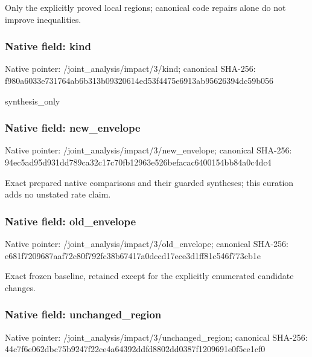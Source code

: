 \documentclass[10pt,a4paper]{article}
\begin{document}
\begingroup\raggedright\sloppy Only the explicitly proved local regions;\allowbreak{} canonical code repairs alone do not improve inequalities.\par\endgroup

\subsubsection{Native field: kind}
Native pointer: /joint\_\allowbreak{}analysis/impact/3/kind; canonical SHA-256: f980a6033e731764ab6b313b09320614ed53f4475e6913ab95626394dc59b056

\begingroup\raggedright\sloppy synthesis\_\allowbreak{}only\par\endgroup

\subsubsection{Native field: new\_\allowbreak{}envelope}
Native pointer: /joint\_\allowbreak{}analysis/impact/3/new\_\allowbreak{}envelope; canonical SHA-256: 94ec5ad95d931dd789ca32c17c70fb12963e526befacac6400154bb84a0c4dc4

\begingroup\raggedright\sloppy Exact prepared native comparisons and their guarded syntheses;\allowbreak{} this curation adds no unstated rate claim.\par\endgroup

\subsubsection{Native field: old\_\allowbreak{}envelope}
Native pointer: /joint\_\allowbreak{}analysis/impact/3/old\_\allowbreak{}envelope; canonical SHA-256: e681f7209687aaf72c80f792fc38b67417a0dccd17ece3d1ff81c546f773cb1e

\begingroup\raggedright\sloppy Exact frozen baseline,\allowbreak{} retained except for the explicitly enumerated candidate changes.\par\endgroup

\subsubsection{Native field: unchanged\_\allowbreak{}region}
Native pointer: /joint\_\allowbreak{}analysis/impact/3/unchanged\_\allowbreak{}region; canonical SHA-256: 44c7f6e062dbc75b9247f22ce4a64392ddfd8802dd0387f1209691e0f5ce1cf0
\end{document}
